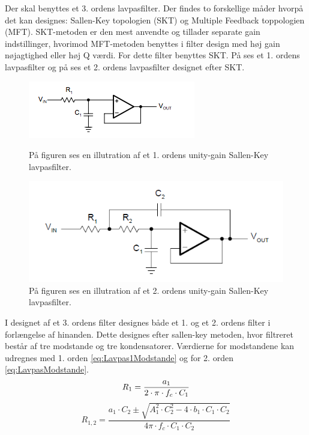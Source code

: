 Der skal benyttes et 3. ordens lavpasfilter. Der findes to forskellige måder hvorpå det kan designes: Sallen-Key topologien (SKT) og Multiple Feedback toppologien (MFT). SKT-metoden er den mest anvendte og tillader separate gain indstillinger, hvorimod MFT-metoden benyttes i filter design med høj gain nøjagtighed eller høj Q værdi. For dette filter benyttes SKT. På  ses et 1. ordens lavpasfilter og på  ses et 2. ordens lavpasfilter designet efter SKT. \cite{Carter2013}
	
\begin{figure}[H]
	\centering
	\begin{minipage}[b]{0.45\textwidth}
		\includegraphics[width=\textwidth]{figures/cProblemloesning/Lavpasfilter1_teoretisk.PNG}
		\caption{På figuren ses en illutration af et 1. ordens unity-gain Sallen-Key lavpasfilter.}
		\label{fig:SallenKey1}
	\end{minipage}
	\hfill
	\begin{minipage}[b]{0.45\textwidth}
		\includegraphics[width=\textwidth]{figures/cProblemloesning/Sallenlavpas.PNG}
		\caption{På figuren ses en illutration af et 2. ordens unity-gain Sallen-Key lavpasfilter.}
		\label{fig:SallenKey2}
	\end{minipage}
\end{figure}

I designet af et 3. ordens filter designes både et 1. og et 2. ordens filter i forlængelse af hinanden. Dette designes efter sallen-key metoden, hvor filtreret består af tre modstande og tre kondensatorer. Værdierne for modstandene kan udregnes med 1. orden \eqref{eq:Lavpas1Modstande} og for 2. orden \eqref{eq:LavpasModstande}. 
\begin{equation} \label{eq:Lavpas1Modstande}
R_{1} = \frac{a_1}{2 \cdot \pi \cdot f_c \cdot C_1} \\
\end{equation}
\begin{equation}
 \label{eq:LavpasModstande}
R_{1,2} = \frac{a_1 \cdot C_2 \pm \sqrt{A_1^2 \cdot C_2^2 - 4 \cdot b_1 \cdot C_1 \cdot C_2}}{4 \pi \cdot f_c \cdot C_1 \cdot C_2}
\end{equation}


